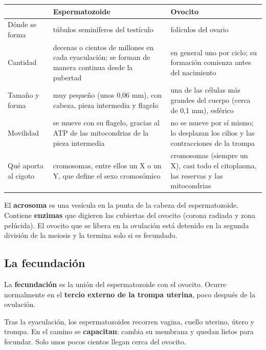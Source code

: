 \begin{center}\small
\begin{tabularx}{\linewidth}{@{}>{\raggedright\arraybackslash\hsize=0.60\hsize}X>{\raggedright\arraybackslash\hsize=1.20\hsize}X>{\raggedright\arraybackslash\hsize=1.20\hsize}X@{}}
\toprule
 & \textbf{Espermatozoide} & \textbf{Ovocito} \\
\midrule
Dónde se forma & túbulos seminíferos del testículo & folículos del ovario \\
Cantidad & decenas o cientos de millones en cada eyaculación; se forman de manera continua desde la pubertad & en general uno por ciclo; su formación comienza antes del nacimiento \\
Tamaño y forma & muy pequeño (unos 0,06 mm), con cabeza, pieza intermedia y flagelo & una de las células más grandes del cuerpo (cerca de 0,1 mm), esférico \\
Movilidad & se mueve con su flagelo, gracias al ATP de las mitocondrias de la pieza intermedia & no se mueve por sí mismo; lo desplazan los cilios y las contracciones de la trompa \\
Qué aporta al cigoto & 23 cromosomas, entre ellos un X o un Y, que define el sexo cromosómico & 23 cromosomas (siempre un X), casi todo el citoplasma, las reservas y las mitocondrias \\
\bottomrule
\end{tabularx}
\end{center}
 
\begin{clave}[{Recuerda}] El \textbf{acrosoma} es una vesícula en la punta de la cabeza del espermatozoide. Contiene \textbf{enzimas} que digieren las cubiertas del ovocito (corona radiada y zona pelúcida). El ovocito que se libera en la ovulación está detenido en la segunda división de la meiosis y la termina solo si es fecundado.\end{clave}
\subsection{La fecundación}
La \textbf{fecundación} es la unión del espermatozoide con el ovocito. Ocurre normalmente en el \textbf{tercio externo de la trompa uterina}, poco después de la ovulación.

 

Tras la eyaculación, los espermatozoides recorren vagina, cuello uterino, útero y trompa. En el camino se \textbf{capacitan}: cambia su membrana y quedan listos para fecundar. Solo unos pocos cientos llegan cerca del ovocito.

